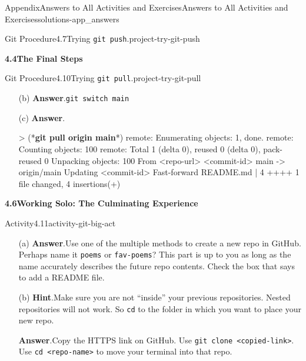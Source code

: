 \documentclass[oneside,10pt,]{book}
\newcommand{\blocktitlefont}{\relax}
\newcommand{\mono}[1]{\texttt{#1}}
\newcommand{\consoleinput}[1]{\textbf{#1}}
\begin{document}
\begin{solutions-chapter}{Appendix}{Answers to All Activities and Exercises}{}{Answers to All Activities and Exercises}{}{}{solutions-app_answers}
\begin{projectsolution}{Git Procedure}{4.7}{Trying \mono{git push}.}{project-try-git-push}
\begin{enumerate}[font=\bfseries,label=(\alph*),ref=\alph*]
\begin{enumerate}[font=\bfseries,label=(\roman*),ref=\theenumi.\roman*]
\end{enumerate}%
\end{enumerate}%
\end{projectsolution}%
\par\medskip
\noindent\textbf{\Large{}4.4\space\textperiodcentered\space{}The Final Steps}
\begin{projectsolution}{Git Procedure}{4.10}{Trying \mono{git pull}.}{project-try-git-pull}%
\begin{enumerate}[font=\bfseries,label=(\alph*),ref=\alph*]%
\item[(b)]\noindent\textbf{\blocktitlefont Answer}.\hypertarget{answer-try-git-pull-f-b-back}{}\quad{}\mono{git switch main}%
\item[(c)]\noindent\textbf{\blocktitlefont Answer}.\hypertarget{answer-try-git-pull-g-b-back}{}\quad{}\begin{console}{0}{1}{0}
> (*\consoleinput{git pull origin main}*)
remote: Enumerating objects: 1, done.
remote: Counting objects: 100%
remote: Total 1 (delta 0), reused 0 (delta 0), pack-reused 0
Unpacking objects: 100%
From <repo-url>
   <commit-id>  main       -> origin/main
Updating <commit-id>
Fast-forward
 README.md | 4 ++++
 1 file changed, 4 insertions(+)
\end{console}
\end{enumerate}%
\end{projectsolution}%
\par\medskip
\noindent\textbf{\Large{}4.6\space\textperiodcentered\space{}Working Solo: The Culminating Experience}
\begin{activitysolution}{Activity}{4.11}{}{activity-git-big-act}%
\begin{enumerate}[font=\bfseries,label=(\alph*),ref=\alph*]%
\item[(a)]\noindent\textbf{\blocktitlefont Answer}.\hypertarget{answer-git-ba-newrepo-b-back}{}\quad{}Use one of the multiple methods to create a new repo in GitHub. Perhaps name it \mono{poems} or \mono{fav-poems}? This part is up to you as long as the name accurately describes the future repo contents. Check the box that says to add a README file.%
\item[(b)]\noindent\textbf{\blocktitlefont Hint}.\hypertarget{hint-git-ba-clone-b-back}{}\quad{}Make sure you are not ``inside'' your previous repositories. Nested repositories will not work. So \mono{cd} to the folder in which you want to place your new repo.%
\par\smallskip%
\noindent\textbf{\blocktitlefont Answer}.\hypertarget{answer-git-ba-clone-c-back}{}\quad{}Copy the HTTPS link on GitHub. Use \mono{git clone <copied-link>}. Use \mono{cd <repo-name>} to move your terminal into that repo.%

\end{enumerate}
\end{activitysolution}
\end{solutions-chapter}
\end{document}

